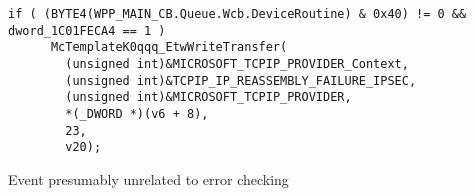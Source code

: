 \documentclass{report}
\begin{document}
\begin{listing}[H]
    \begin{verbatim}
if ( (BYTE4(WPP_MAIN_CB.Queue.Wcb.DeviceRoutine) & 0x40) != 0 && dword_1C01FECA4 == 1 )
      McTemplateK0qqq_EtwWriteTransfer(
        (unsigned int)&MICROSOFT_TCPIP_PROVIDER_Context,
        (unsigned int)&TCPIP_IP_REASSEMBLY_FAILURE_IPSEC,
        (unsigned int)&MICROSOFT_TCPIP_PROVIDER,
        *(_DWORD *)(v6 + 8),
        23,
        v20);
\end{verbatim}
\caption{Event presumably unrelated to error checking}
\label{listing:detection:etw:last-event}
\end{listing}
\end{document}
